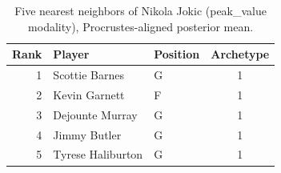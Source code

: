 \begin{table}[htbp]
  \centering\small
  \begin{tabular}{rllc}
    \toprule
    Rank & Player & Position & Archetype \\
    \midrule
    1 & Scottie Barnes & G & 1 \\
    2 & Kevin Garnett & F & 1 \\
    3 & Dejounte Murray & G & 1 \\
    4 & Jimmy Butler & G & 1 \\
    5 & Tyrese Haliburton & G & 1 \\
    \bottomrule
  \end{tabular}
  \caption{Five nearest neighbors of Nikola Jokic (peak_value modality), Procrustes-aligned posterior mean.}
  \label{tab:Nikola_Jokic_neighbors_peak_value}
\end{table}

